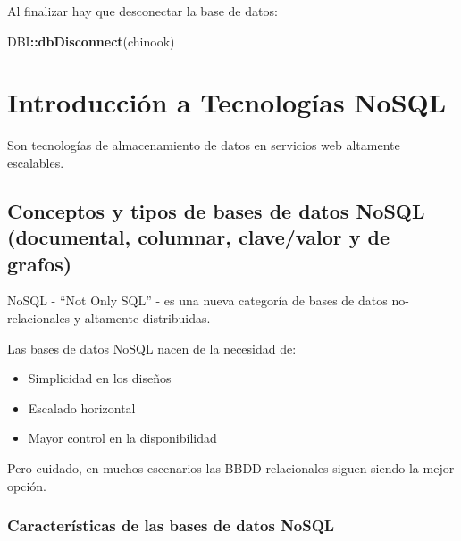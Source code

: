 \documentclass[
]{book}
\newenvironment{Shaded}{\begin{snugshade}}{\end{snugshade}}
\newcommand{\FunctionTok}[1]{\textcolor[rgb]{0.13,0.29,0.53}{\textbf{#1}}}
\newcommand{\NormalTok}[1]{#1}
\newcommand{\SpecialCharTok}[1]{\textcolor[rgb]{0.81,0.36,0.00}{\textbf{#1}}}
\begin{document}
Al finalizar hay que desconectar la base de datos:

\begin{Shaded}
\begin{Highlighting}[]
\NormalTok{DBI}\SpecialCharTok{::}\FunctionTok{dbDisconnect}\NormalTok{(chinook)            }
\end{Highlighting}
\end{Shaded}

\hypertarget{introducciuxf3n-a-tecnologuxedas-nosql}{%
\chapter{Introducción a Tecnologías NoSQL}\label{introducciuxf3n-a-tecnologuxedas-nosql}}

Son tecnologías de almacenamiento de datos en servicios web altamente escalables.

\hypertarget{conceptos-y-tipos-de-bases-de-datos-nosql-documental-columnar-clavevalor-y-de-grafos}{%
\section{Conceptos y tipos de bases de datos NoSQL (documental, columnar, clave/valor y de grafos)}\label{conceptos-y-tipos-de-bases-de-datos-nosql-documental-columnar-clavevalor-y-de-grafos}}

NoSQL - ``Not Only SQL'' - es una nueva categoría de bases de datos no-relacionales y altamente distribuidas.

Las bases de datos NoSQL nacen de la necesidad de:

\begin{itemize}
\item
  Simplicidad en los diseños
\item
  Escalado horizontal
\item
  Mayor control en la disponibilidad
\end{itemize}

Pero cuidado, en muchos escenarios las BBDD relacionales siguen siendo la mejor opción.

\hypertarget{caracteruxedsticas-de-las-bases-de-datos-nosql}{%
\subsection{Características de las bases de datos NoSQL}\label{caracteruxedsticas-de-las-bases-de-datos-nosql}}
\end{document}
